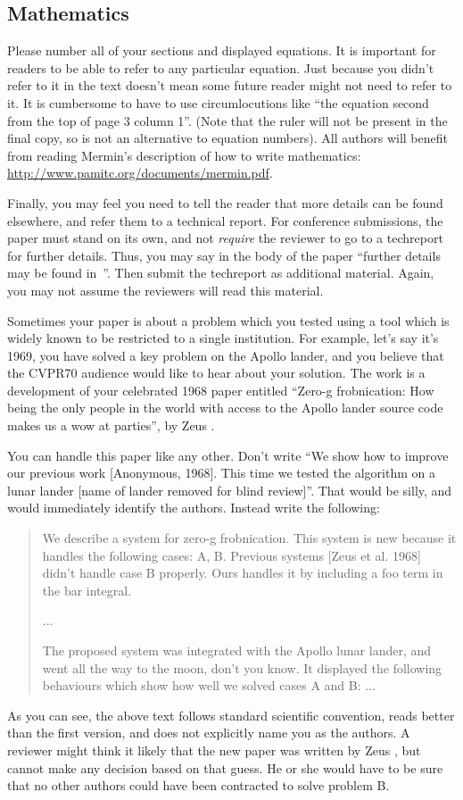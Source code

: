 \documentclass[10pt,twocolumn,letterpaper]{article}
\begin{document}
\subsection{Mathematics}

Please number all of your sections and displayed equations.  It is
important for readers to be able to refer to any particular equation.  Just
because you didn't refer to it in the text doesn't mean some future reader
might not need to refer to it.  It is cumbersome to have to use
circumlocutions like ``the equation second from the top of page 3 column
1''.  (Note that the ruler will not be present in the final copy, so is not
an alternative to equation numbers).  All authors will benefit from reading
Mermin's description of how to write mathematics:
\url{http://www.pamitc.org/documents/mermin.pdf}.

Finally, you may feel you need to tell the reader that more details can be
found elsewhere, and refer them to a technical report.  For conference
submissions, the paper must stand on its own, and not {\em require} the
reviewer to go to a techreport for further details.  Thus, you may say in
the body of the paper ``further details may be found
in~\cite{Authors14b}''.  Then submit the techreport as additional material.
Again, you may not assume the reviewers will read this material.

Sometimes your paper is about a problem which you tested using a tool which
is widely known to be restricted to a single institution.  For example,
let's say it's 1969, you have solved a key problem on the Apollo lander,
and you believe that the CVPR70 audience would like to hear about your
solution.  The work is a development of your celebrated 1968 paper entitled
``Zero-g frobnication: How being the only people in the world with access to
the Apollo lander source code makes us a wow at parties'', by Zeus \etal.

You can handle this paper like any other.  Don't write ``We show how to
improve our previous work [Anonymous, 1968].  This time we tested the
algorithm on a lunar lander [name of lander removed for blind review]''.
That would be silly, and would immediately identify the authors. Instead
write the following:
\begin{quotation}
\noindent
   We describe a system for zero-g frobnication.  This
   system is new because it handles the following cases:
   A, B.  Previous systems [Zeus et al. 1968] didn't
   handle case B properly.  Ours handles it by including
   a foo term in the bar integral.

   ...

   The proposed system was integrated with the Apollo
   lunar lander, and went all the way to the moon, don't
   you know.  It displayed the following behaviours
   which show how well we solved cases A and B: ...
\end{quotation}
As you can see, the above text follows standard scientific convention,
reads better than the first version, and does not explicitly name you as
the authors.  A reviewer might think it likely that the new paper was
written by Zeus \etal, but cannot make any decision based on that guess.
He or she would have to be sure that no other authors could have been
contracted to solve problem B.
\medskip
\end{document}
